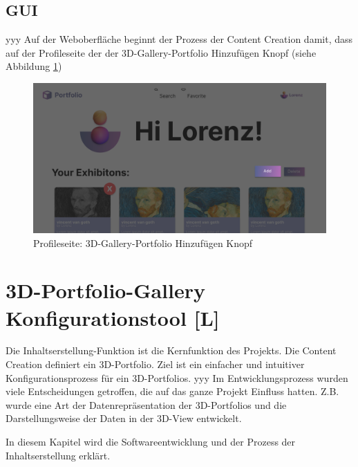 \subsection{GUI}
yyy Auf der Weboberfläche beginnt der Prozess der Content Creation damit, dass auf der Profileseite der der 3D-Gallery-Portfolio Hinzufügen Knopf (siehe Abbildung \ref{fig:impl:creation:add3dPorftolio})

\begin{figure}
    \centering
    \includegraphics[scale=0.32]{pics/profilepage_addButton.png}
    \caption{Profileseite: 3D-Gallery-Portfolio Hinzufügen Knopf}
    \label{fig:impl:creation:add3dPorftolio}
\end{figure}


 








\section{3D-Portfolio-Gallery Konfigurationstool [L]} \label{Konfigurationstool}

Die Inhaltserstellung-Funktion ist die Kernfunktion des Projekts. Die Content Creation definiert ein 3D-Portfolio. Ziel ist ein einfacher und intuitiver Konfigurationsprozess für ein 3D-Portfolios. 
yyy Im Entwicklungsprozess wurden viele Entscheidungen getroffen, die auf das ganze Projekt Einfluss hatten. Z.B. wurde eine Art der Datenrepräsentation der 3D-Portfolios und die Darstellungsweise der Daten in der 3D-View entwickelt.

In diesem Kapitel wird die Softwareentwicklung und der Prozess der Inhaltserstellung erklärt.

